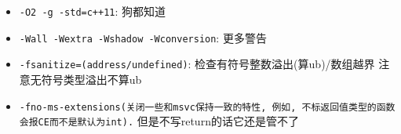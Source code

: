 \begin{itemize}
	\item \texttt{-O2 -g -std=c++11}: 狗都知道
	\item \texttt{-Wall -Wextra -Wshadow -Wconversion}: 更多警告
	\item \texttt{-fsanitize=(address/undefined)}: 检查有符号整数溢出(算ub)/数组越界
		\subitem 注意无符号类型溢出不算ub
	\item \texttt{-fno-ms-extensions(关闭一些和msvc保持一致的特性, 例如, 不标返回值类型的函数会报CE而不是默认为\texttt{int}).}
		\subitem 但是不写return的话它还是管不了
\end{itemize}